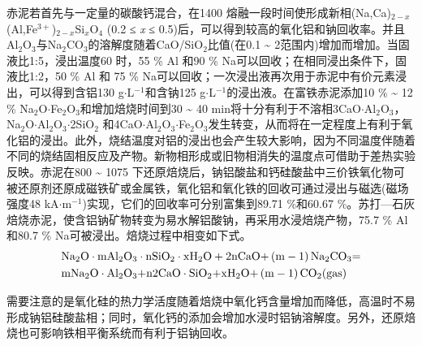 赤泥若首先与一定量的碳酸钙混合，在1400 \textcelsius 熔融一段时间使形成新相(Na,Ca)$ _{\mathrm{2-}\mathit{x}} $(Al,Fe$ ^{\mathrm{3+}} $)$ _{\mathrm{2-}\mathit{x}} $Si$ _{\mathit{x}} $O$ _{\mathrm{4}} $ (0.2 ≤ \textit{x} ≤ 0.5)后，可以得到较高的氧化铝和钠回收率\cite{bruckard2013smelting}。并且Al$ _{\mathrm{2}} $O$ _{\mathrm{3}} $与Na$ _{\mathrm{2}} $CO$ _{\mathrm{3}} $的溶解度随着CaO/SiO$ _{\mathrm{2}} $比值(在0.1 \textasciitilde{ }2范围内)增加而增加。当固液比1:5，浸出温度60 \textcelsius 时，55 \% Al 和90 \% Na可以回收；在相同浸出条件下，固液比1:2，50 \% Al 和 75 \% Na可以回收；一次浸出液再次用于赤泥中有价元素浸出，可以得到含铝130 g$ \cdot $L$ ^{\mathrm{-1}} $和含钠125 g$ \cdot $L$ ^{\mathrm{-1}} $的浸出液。在富铁赤泥添加10 \% \textasciitilde{ }12 \% Na$ _{\mathrm{2}} $O$ \cdot $Fe$ _{\mathrm{2}} $O$ _{\mathrm{3}} $和增加焙烧时间到30 \textasciitilde{ }40 min将十分有利于不溶相3CaO$ \cdot $Al$ _{\mathrm{2}} $O$ _{\mathrm{3}} $，Na$ _{\mathrm{2}} $O$ \cdot $Al$ _{\mathrm{2}} $O$ _{\mathrm{3}} $$ \cdot $2SiO$ _{\mathrm{2}} $ 和4CaO$ \cdot $Al$ _{\mathrm{2}} $O$ _{\mathrm{3}} $$ \cdot $Fe$ _{\mathrm{2}} $O$ _{\mathrm{3}} $发生转变，从而将在一定程度上有利于氧化铝的浸出。此外，烧结温度对铝的浸出也会产生较大影响，因为不同温度伴随着不同的烧结固相反应及产物。新物相形成或旧物相消失的温度点可借助于差热实验反映\cite{zhou2008alumina}。赤泥在800 \textasciitilde{ }1075 \textcelsius 下还原焙烧后，钠铝酸盐和钙硅酸盐中三价铁氧化物可被还原剂还原成磁铁矿或金属铁，氧化铝和氧化铁的回收可通过浸出与磁选(磁场强度48 kA$ \cdot $m$ ^{\mathrm{-1}} $)实现，它们的回收率可分别富集到89.71 \%和60.67 \%\cite{li2009recovery}。苏打—石灰焙烧赤泥，使含铝钠矿物转变为易水解铝酸钠，再采用水浸焙烧产物，75.7 \% Al和80.7 \% Na可被浸出\cite{liu2012experimental}。焙烧过程中相变如下式。
\begin{equation}
\begin{split}
&{\rm{N}}{{\rm{a}}_{\rm{2}}}{\rm{O}} \cdot {\rm{mA}}{{\rm{l}}_{\rm{2}}}{{\rm{O}}_{\rm{3}}} \cdot {\rm{nSi}}{{\rm{O}}_{\rm{2}}} \cdot {\rm{x}}{{\rm{H}}_{\rm{2}}}{\rm{O + 2nCaO + }}\left( {{\rm{m - 1}}} \right){\rm{N}}{{\rm{a}}_{\rm{2}}}{\rm{C}}{{\rm{O}}_{\rm{3}}}{\rm{   = }}\\
&{\rm{mN}}{{\rm{a}}_{\rm{2}}}{\rm{O}} \cdot {\rm{A}}{{\rm{l}}_{\rm{2}}}{{\rm{O}}_{\rm{3}}}{\rm{ + n 2CaO}} \cdot {\rm{Si}}{{\rm{O}}_{\rm{2}}}{\rm{ + x}}{{\rm{H}}_{\rm{2}}}{\rm{O + }}\left( {{\rm{m - 1}}} \right){\rm{C}}{{\rm{O}}_{\rm{2}}}({\rm{gas}})
\end{split}
\end{equation}

需要注意的是氧化硅的热力学活度随着焙烧中氧化钙含量增加而降低，高温时不易形成钠铝硅酸盐相；同时，氧化钙的添加会增加水浸时铝钠溶解度。另外，还原焙烧也可影响铁相平衡系统而有利于铝钠回收。


